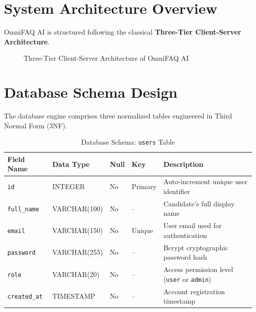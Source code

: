 \documentclass[12pt,a4paper]{report}
\begin{document}
\section{System Architecture Overview}
OmniFAQ AI is structured following the classical \textbf{Three-Tier Client-Server Architecture}.

\begin{figure}[h!]
\centering
{}
\caption{Three-Tier Client-Server Architecture of OmniFAQ AI}
\label{fig:architecture}
\end{figure}

\section{Database Schema Design}
The database engine comprises three normalized tables engineered in Third Normal Form (3NF).

\begin{table}[h!]
\centering
\caption{Database Schema: \texttt{users} Table}
\label{tab:users}
\begin{tabularx}{\textwidth}{llllX}
\toprule
\textbf{Field Name} & \textbf{Data Type} & \textbf{Null} & \textbf{Key} & \textbf{Description} \\
\midrule
\texttt{id} & INTEGER & No & Primary & Auto-increment unique user identifier \\
\texttt{full\_name} & VARCHAR(100) & No & -- & Candidate's full display name \\
\texttt{email} & VARCHAR(150) & No & Unique & User email used for authentication \\
\texttt{password} & VARCHAR(255) & No & -- & Bcrypt cryptographic password hash \\
\texttt{role} & VARCHAR(20) & No & -- & Access permission level (\texttt{user} or \texttt{admin}) \\
\texttt{created\_at} & TIMESTAMP & No & -- & Account registration timestamp \\
\bottomrule
\end{tabularx}
\end{table}
\end{document}
